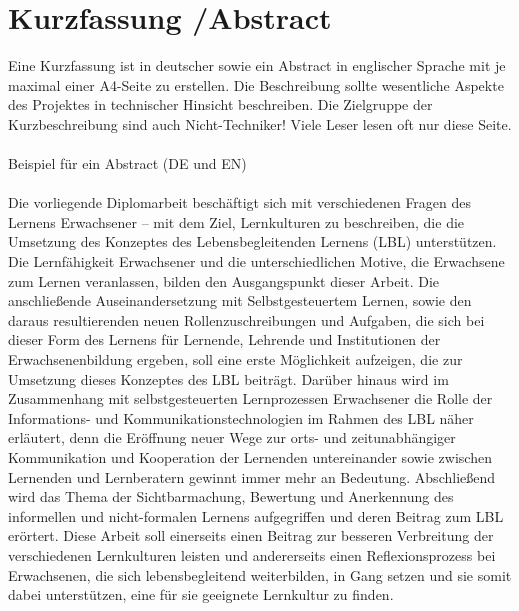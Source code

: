 

\chapter*{Kurzfassung /Abstract }
\label{cha:abstract}

Eine Kurzfassung ist in deutscher sowie ein Abstract in englischer Sprache mit je maximal einer A4-Seite zu erstellen. Die Beschreibung sollte wesentliche Aspekte des Projektes in technischer Hinsicht beschreiben. Die Zielgruppe der Kurzbeschreibung sind auch Nicht-Techniker! Viele Leser lesen oft nur diese Seite. \\ \\

Beispiel für ein Abstract (DE und EN) \\ \\
Die vorliegende Diplomarbeit beschäftigt sich mit verschiedenen Fragen des Lernens Erwachsener – mit dem Ziel, Lernkulturen zu beschreiben, die die Umsetzung des Konzeptes des Lebensbegleitenden Lernens (LBL) unterstützen. Die Lernfähigkeit Erwachsener und die unterschiedlichen Motive, die Erwachsene zum Lernen veranlassen, bilden den Ausgangspunkt dieser Arbeit. Die anschließende Auseinandersetzung mit Selbstgesteuertem Lernen, sowie den daraus resultierenden neuen Rollenzuschreibungen und Aufgaben, die sich bei dieser Form des Lernens für Lernende, Lehrende und Institutionen der Erwachsenenbildung ergeben, soll eine erste Möglichkeit aufzeigen, die zur Umsetzung dieses Konzeptes des LBL beiträgt. Darüber hinaus wird im Zusammenhang mit selbstgesteuerten Lernprozessen Erwachsener die Rolle der Informations- und Kommunikationstechnologien im Rahmen des LBL näher erläutert, denn die Eröffnung neuer Wege zur orts- und zeitunabhängiger Kommunikation und Kooperation der Lernenden untereinander sowie zwischen Lernenden und Lernberatern gewinnt immer mehr an Bedeutung. Abschließend wird das Thema der Sichtbarmachung, Bewertung und Anerkennung des informellen und nicht-formalen Lernens aufgegriffen und deren Beitrag zum LBL erörtert. Diese Arbeit soll einerseits einen Beitrag zur besseren Verbreitung der verschiedenen Lernkulturen leisten und andererseits einen Reflexionsprozess bei Erwachsenen, die sich lebensbegleitend weiterbilden, in Gang setzen und sie somit dabei unterstützen, eine für sie geeignete Lernkultur zu finden. \\ \\


